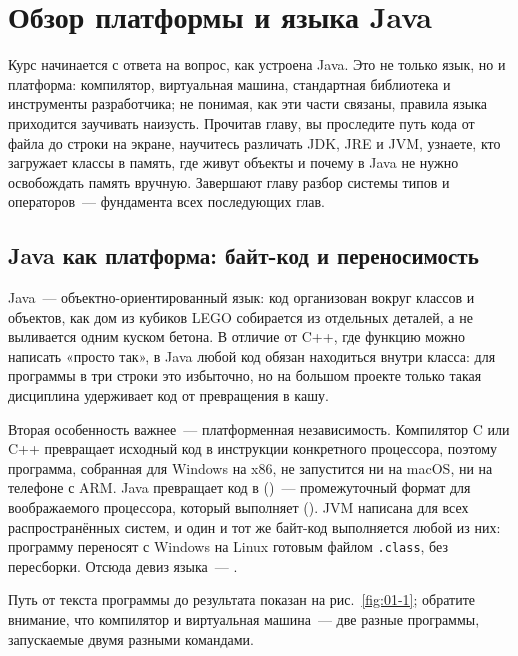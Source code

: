 \chapter{Обзор платформы и языка Java}
\label{ch:01}

Курс начинается с ответа на вопрос, как устроена Java. Это не только язык, но и
платформа: компилятор, виртуальная машина, стандартная библиотека и инструменты
разработчика; не понимая, как эти части связаны, правила языка приходится
заучивать наизусть. Прочитав главу, вы проследите путь кода от файла до строки
на экране, научитесь различать JDK, JRE и JVM, узнаете, кто загружает классы в
память, где живут объекты и почему в Java не нужно освобождать память вручную.
Завершают главу разбор системы типов и операторов~--- фундамента всех
последующих глав.

\section{Java как платформа: байт-код и переносимость}

Java~--- объектно-ориентированный язык: код организован вокруг классов и
объектов, как дом из кубиков LEGO собирается из отдельных деталей, а не
выливается одним куском бетона. В отличие от C++, где функцию можно написать
«просто так», в Java любой код обязан находиться внутри класса: для программы в
три строки это избыточно, но на большом проекте только такая дисциплина
удерживает код от превращения в кашу.

Вторая особенность важнее~--- платформенная независимость. Компилятор C или C++
превращает исходный код в инструкции конкретного процессора, поэтому программа,
собранная для Windows на x86, не запустится ни на macOS, ни на телефоне с ARM.
Java превращает код в  ()~--- промежуточный формат
для воображаемого процессора, который выполняет 
(). JVM написана для всех распространённых
систем, и один и тот же байт-код выполняется любой из них: программу переносят
с Windows на Linux готовым файлом \texttt{.class}, без пересборки. Отсюда девиз
языка~--- .

Путь от текста программы до результата показан на рис.~\ref{fig:01-1}; обратите
внимание, что компилятор и виртуальная машина~--- две разные программы,
запускаемые двумя разными командами.

